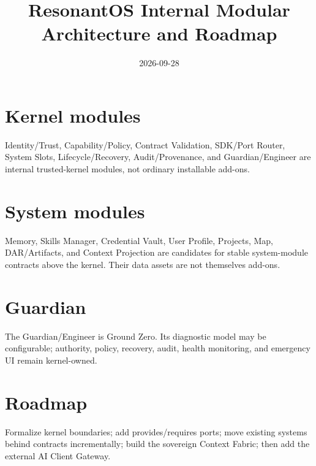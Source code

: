 \documentclass[11pt]{article}
\title{ResonantOS Internal Modular Architecture and Roadmap}\date{2026-09-28}
\begin{document}
\maketitle
\section{Kernel modules}
Identity/Trust, Capability/Policy, Contract Validation, SDK/Port Router, System Slots, Lifecycle/Recovery, Audit/Provenance, and Guardian/Engineer are internal trusted-kernel modules, not ordinary installable add-ons.
\section{System modules}
Memory, Skills Manager, Credential Vault, User Profile, Projects, Map, DAR/Artifacts, and Context Projection are candidates for stable system-module contracts above the kernel. Their data assets are not themselves add-ons.
\section{Guardian}
The Guardian/Engineer is Ground Zero. Its diagnostic model may be configurable; authority, policy, recovery, audit, health monitoring, and emergency UI remain kernel-owned.
\section{Roadmap}
Formalize kernel boundaries; add provides/requires ports; move existing systems behind contracts incrementally; build the sovereign Context Fabric; then add the external AI Client Gateway.
\end{document}

